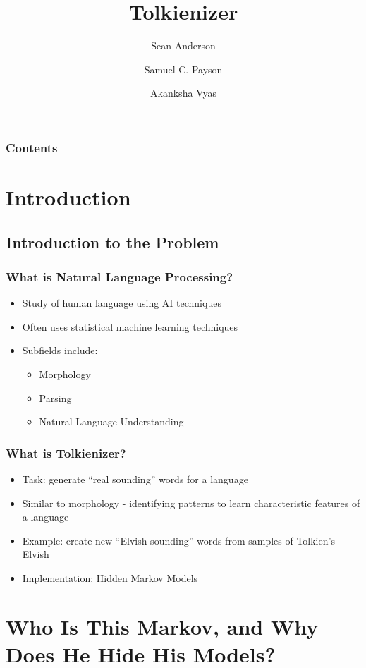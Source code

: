 \documentclass{beamer}
\title{Tolkienizer}
\author{Sean Anderson \and Samuel C. Payson \and Akanksha Vyas}
\begin{document}
\begin{frame}
\titlepage
\end{frame}

\begin{frame}
   \frametitle{Contents}
   \tableofcontents
\end{frame}

\section{Introduction}

\subsection{Introduction to the Problem}

\begin{frame}
   \frametitle{What is Natural Language Processing?}
   \begin{itemize}
      \item Study of human language using AI techniques
      \item Often uses statistical machine learning techniques
      \item Subfields include:
      \begin{itemize}
         \item Morphology
         \item Parsing
         \item Natural Language Understanding
      \end{itemize}
   \end{itemize}
\end{frame}

\begin{frame}
   \frametitle{What is Tolkienizer?}
   \begin{itemize}
      \item Task: generate ``real sounding'' words for a language
      \item Similar to morphology - identifying patterns to learn
      characteristic features of a language
      \item Example: create new ``Elvish sounding'' words from samples of Tolkien's Elvish
      \item Implementation: Hidden Markov Models
   \end{itemize}
\end{frame}

\section{Who Is This Markov, and Why Does He Hide His Models?}
\end{document}
